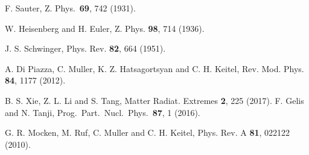 \documentclass[aps,preprint,superscriptaddress]{revtex4}
\begin{document}
\begin{thebibliography}{99}\suppressfloats

%
F. Sauter,
Z. Phys.\ {\textbf{69}}, 742 (1931).

W. Heisenberg and H. Euler,
Z. Phys. \textbf{98}, 714 (1936).

J. S. Schwinger,
Phys. Rev. \textbf{82}, 664 (1951).

A. Di Piazza, C. Muller, K. Z. Hatsagortsyan and C. H. Keitel,
Rev. Mod. Phys. {\textbf{84}}, 1177 (2012).

B. S. Xie, Z. L. Li and S. Tang, Matter Radiat. Extremes {\textbf 2},
225 (2017).
F. Gelis and N. Tanji,
Prog.\ Part.\ Nucl.\ Phys.\ {\textbf{87}}, 1 (2016).

G. R. Mocken, M. Ruf, C. Muller and C. H. Keitel,
Phys. Rev. A {\textbf{81}}, 022122 (2010).


\end{thebibliography}
\end{document}
